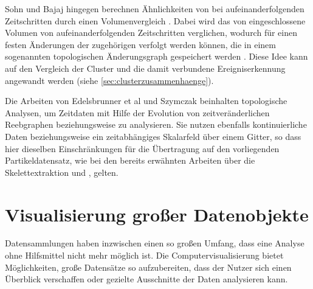 Sohn und Bajaj hingegen berechnen Ähnlichkeiten von  bei aufeinanderfolgenden Zeitschritten durch einen Volumenvergleich \cite{silver1997trackingTurbulent3DFeatures}. Dabei wird das von  eingeschlossene Volumen von aufeinanderfolgenden Zeitschritten verglichen, wodurch für einen festen  Änderungen der zugehörigen  verfolgt werden können, die in einem sogenannten topologischen Änderungsgraph gespeichert werden \cite{sohn2006timeVaryingContourTopology}. Diese Idee kann auf den Vergleich der Cluster und die damit verbundene Ereigniserkennung angewandt werden (siehe \autoref{sec:clusterzusammenhaenge}).

Die Arbeiten von Edelsbrunner et al \cite{edelsbrunner2004timeVaryingReebGraphs} und Szymczak \cite{szymczak2005contourEvolutionInTimeDependentScalarFields} beinhalten topologische Analysen, um Zeitdaten mit Hilfe der Evolution von zeitveränderlichen Reebgraphen beziehungsweise  zu analysieren. Sie nutzen ebenfalls kontinuierliche Daten beziehungsweise ein zeitabhängiges Skalarfeld über einem Gitter, so dass hier dieselben Einschränkungen für die Übertragung auf den vorliegenden Partikeldatensatz, wie bei den bereits erwähnten Arbeiten über die Skelettextraktion und , gelten.

\section{Visualisierung großer Datenobjekte}\label{sec:related-vis}


Datensammlungen haben inzwischen einen so großen Umfang, dass eine Analyse ohne Hilfsmittel nicht mehr möglich ist. Die Computervisualisierung bietet Möglichkeiten, große Datensätze so aufzubereiten, dass der Nutzer sich einen Überblick verschaffen oder gezielte Ausschnitte der Daten analysieren kann.

